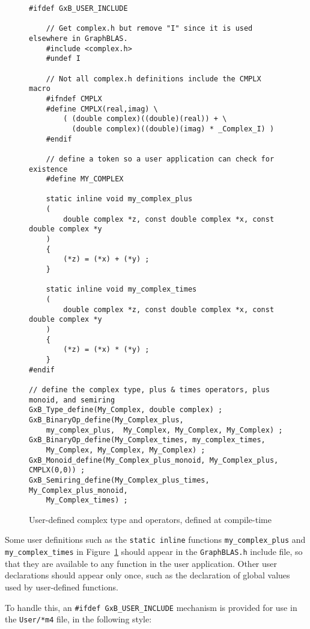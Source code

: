 \documentclass[12pt]{article}
\begin{document}
\begin{figure}
\begin{mdframed}[leftmargin=-0.4in,userdefinedwidth=5.8in]
{\footnotesize
\begin{verbatim}
#ifdef GxB_USER_INCLUDE

    // Get complex.h but remove "I" since it is used elsewhere in GraphBLAS.
    #include <complex.h>
    #undef I

    // Not all complex.h definitions include the CMPLX macro
    #ifndef CMPLX
    #define CMPLX(real,imag) \
        ( (double complex)((double)(real)) + \
          (double complex)((double)(imag) * _Complex_I) )
    #endif

    // define a token so a user application can check for existence
    #define MY_COMPLEX

    static inline void my_complex_plus
    (
        double complex *z, const double complex *x, const double complex *y
    )
    {
        (*z) = (*x) + (*y) ;
    }

    static inline void my_complex_times
    (
        double complex *z, const double complex *x, const double complex *y
    )
    {
        (*z) = (*x) * (*y) ;
    }
#endif

// define the complex type, plus & times operators, plus monoid, and semiring
GxB_Type_define(My_Complex, double complex) ;
GxB_BinaryOp_define(My_Complex_plus,
    my_complex_plus,  My_Complex, My_Complex, My_Complex) ;
GxB_BinaryOp_define(My_Complex_times, my_complex_times,
    My_Complex, My_Complex, My_Complex) ;
GxB_Monoid_define(My_Complex_plus_monoid, My_Complex_plus, CMPLX(0,0)) ;
GxB_Semiring_define(My_Complex_plus_times, My_Complex_plus_monoid,
    My_Complex_times) ; \end{verbatim}}
\end{mdframed}
\caption{User-defined complex type and operators, defined at compile-time
\label{fig:complex}}
\end{figure}

Some user definitions such as the \verb'static inline' functions
\verb'my_complex_plus' and \verb'my_complex_times' in Figure~\ref{fig:complex}
should appear in the \verb'GraphBLAS.h' include file, so that they are
available to any function in the user application.  Other user declarations
should appear only once, such as the declaration of global values used by
user-defined functions.

To handle this, an \verb'#ifdef GxB_USER_INCLUDE' mechanism is provided for
use in the \verb'User/*m4' file, in the following style:
\end{document}
